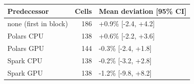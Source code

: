 \begin{tabular}{lrl}
\toprule
Predecessor & Cells & Mean deviation [95\% CI] \\
\midrule
none (first in block) & 186 & +0.9\% [-2.4, +4.2] \\
Polars CPU & 138 & +0.6\% [-2.2, +3.6] \\
Polars GPU & 144 & -0.3\% [-2.4, +1.8] \\
Spark CPU & 138 & -0.2\% [-3.2, +2.8] \\
Spark GPU & 138 & -1.2\% [-9.8, +8.2] \\
\bottomrule
\end{tabular}
